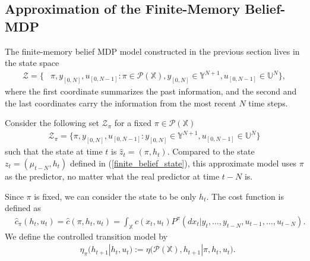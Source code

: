 \documentclass[11pt]{article}
\def\P{{\mathcal P}}
\begin{document}
\subsection{Approximation of the Finite-Memory Belief-MDP}\label{app_section}
The finite-memory belief MDP model constructed in the previous section lives in the state space
\begin{align*}
{\mathcal{Z}}=\bigg\{&\pi,y_{[0,N]},u_{[0,N-1]}:\pi\in\mathcal{P}(\mathds{X}), y_{[0,N]}\in{\mathds{Y}}^{N+1}, u_{[0,N-1]}\in\mathds{U}^N\bigg\},
\end{align*}
where the first coordinate summarizes the past information, and the second and the last coordinates carry the information from the most recent $N$ time steps.

Consider the following set ${\mathcal{Z}}_{\pi}$ for a fixed $\pi\in\P(\mathds{X})$
\begin{align*}%
{\mathcal{Z}}_{\pi}=\bigg\{\pi,y_{[0,N]},u_{[0,N-1]}: y_{[0,N]}\in{\mathds{Y}}^{N+1}, u_{[0,N-1]}\in\mathds{U}^N\bigg\}
\end{align*}
such that the state at time $t$ is $\hat{z}_t=(\pi,h_t)$. Compared to the state ${z}_t=(\mu_{t-N},h_t)$ defined in (\ref{finite_belief_state}), this approximate model uses $\pi$ as the predictor, no matter what the real predictor at time $t-N$ is.

Since $\pi$ is fixed, we can consider the state to be only $h_t$.
The cost function is defined as 
\begin{align}\label{cost_window}
&\hat{c}_\pi({h}_t,u_t)=\hat{c}(\pi,h_t,u_t)=\int_\mathds{X}c(x_t,u_t)P^{\pi}(dx_t|y_t,\dots,y_{t-N},u_{t-1},\dots,u_{t-N}).
\end{align}
We define the controlled transition model by 
\begin{align}\label{eta_N}
&{\eta}_\pi({h}_{t+1}|{h}_t,u_t):={\eta}\bigg(\P(\mathds{X}),h_{t+1}|\pi,h_t,u_t\bigg).
\end{align}
\end{document}
